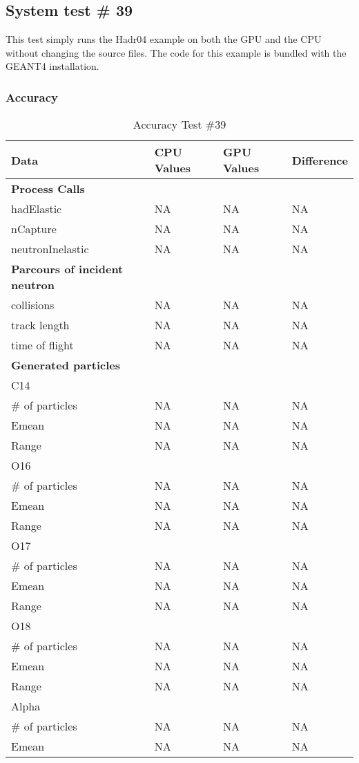 \documentclass[12pt]{article}
\begin{document}
\subsection{System test \# 39}
This test simply runs the Hadr04 example on both the GPU and the CPU without changing the source files. The code for this example is bundled with the GEANT4 installation.\\
	\subsubsection{Accuracy}
		\begin{table}[!htbp]
		\centering
		\caption{Accuracy Test \#39}\label{_acc}
		\begin{tabular}{llll}
		\toprule
		\bf Data & CPU Values & GPU Values & Difference\\\midrule
		\bf Process Calls&&&\\
		hadElastic&NA&NA&NA\\
		nCapture&NA&NA&NA\\
		neutronInelastic&NA&NA&NA\\ 
		\bf Parcours of incident neutron&&&\\
		collisions&NA&NA&NA\\
		track length&NA&NA&NA\\
		time of flight&NA&NA&NA\\
		\bf Generated particles&&&\\
		C14&&&\\
		\# of particles&NA&NA&NA\\
		Emean&NA&NA&NA\\
		Range&NA&NA&NA\\
		O16&&&\\
		\# of particles&NA&NA&NA\\
		Emean&NA&NA&NA\\
		Range&NA&NA&NA\\
		O17&&&\\
		\# of particles&NA&NA&NA\\
		Emean&NA&NA&NA\\
		Range&NA&NA&NA\\
		O18&&&\\
		\# of particles&NA&NA&NA\\
		Emean&NA&NA&NA\\
		Range&NA&NA&NA\\
		Alpha&&&\\
		\# of particles&NA&NA&NA\\
		Emean&NA&NA&NA\\

\end{tabular}
\end{table}
\end{document}
